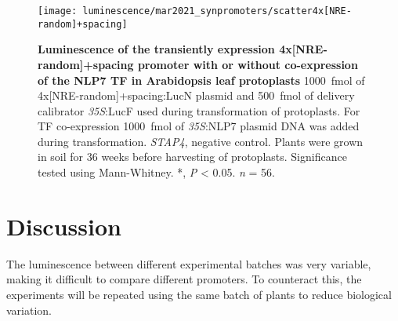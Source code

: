 \documentclass[../main.tex]{subfiles}
\begin{document}
\begin{figure}[hbt!]
	\begin{center}
		\capstart
		\texttt{[image: luminescence/mar2021\_synpromoters/scatter4x[NRE-random]+spacing]}
		\caption{
			\textbf{Luminescence of the transiently expression 4x[NRE-random]+spacing promoter with or without co\hyp{}expression of the NLP7 TF in Arabidopsis leaf protoplasts}
			\SI{1000}{\fmol} of 4x[NRE-random]+spacing:LucN plasmid and \SI{500}{\fmol} of delivery calibrator \textit{35S}:LucF used during transformation of protoplasts.
			For TF co\hyp{}expression \SI{1000}{\fmol} of \textit{35S}:NLP7 plasmid DNA was added during transformation.
			\textit{STAP4}, negative control.
			Plants were grown in soil for 3\textendash{}6 weeks before harvesting of protoplasts.
			Significance tested using Mann-Whitney.
			*, \textit{P} \textless{} 0.05.
			\textit{n} = 5\textendash{}6.
			\label{fig:4xnre-random-spacing}
		}
	\end{center}
\end{figure}

\section{Discussion}\label{chapter5:discussion}

The luminescence between different experimental batches was very variable, making it difficult to compare different promoters.
To counteract this, the experiments will be repeated using the same batch of plants to reduce biological variation.
\end{document}
